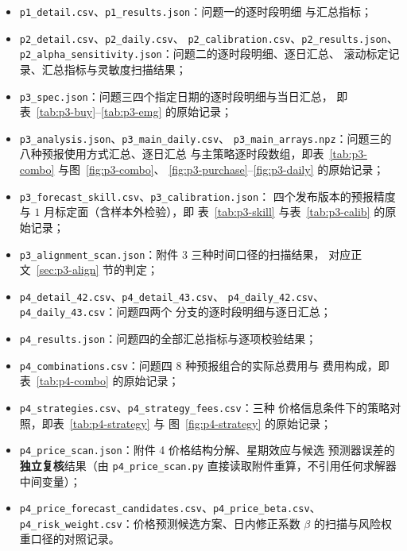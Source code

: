 \documentclass[withoutpreface,bwprint]{cumcmthesis}
\begin{document}
\begin{appendices}
\begin{itemize}
  \item \texttt{p1\_detail.csv}、\texttt{p1\_results.json}：问题一的逐时段明细
        与汇总指标；
  \item \texttt{p2\_detail.csv}、\texttt{p2\_daily.csv}、
        \texttt{p2\_calibration.csv}、\texttt{p2\_results.json}、
        \texttt{p2\_alpha\_sensitivity.json}：问题二的逐时段明细、逐日汇总、
        滚动标定记录、汇总指标与灵敏度扫描结果；
  \item \texttt{p3\_spec.json}：问题三四个指定日期的逐时段明细与当日汇总，
        即表~\ref{tab:p3-buy}--\ref{tab:p3-emg} 的原始记录；
  \item \texttt{p3\_analysis.json}、\texttt{p3\_main\_daily.csv}、
        \texttt{p3\_main\_arrays.npz}：问题三的八种预报使用方式汇总、逐日汇总
        与主策略逐时段数组，即表~\ref{tab:p3-combo} 与图~\ref{fig:p3-combo}、
        \ref{fig:p3-purchase}--\ref{fig:p3-daily} 的原始记录；
  \item \texttt{p3\_forecast\_skill.csv}、\texttt{p3\_calibration.json}：
        四个发布版本的预报精度与 $1$ 月标定面（含样本外检验），即
        表~\ref{tab:p3-skill} 与表~\ref{tab:p3-calib} 的原始记录；
  \item \texttt{p3\_alignment\_scan.json}：附件 3 三种时间口径的扫描结果，
        对应正文~\ref{sec:p3-align} 节的判定；
  \item \texttt{p4\_detail\_42.csv}、\texttt{p4\_detail\_43.csv}、
        \texttt{p4\_daily\_42.csv}、\texttt{p4\_daily\_43.csv}：问题四两个
        分支的逐时段明细与逐日汇总；
  \item \texttt{p4\_results.json}：问题四的全部汇总指标与逐项校验结果；
  \item \texttt{p4\_combinations.csv}：问题四 $8$ 种预报组合的实际总费用与
        费用构成，即表~\ref{tab:p4-combo} 的原始记录；
  \item \texttt{p4\_strategies.csv}、\texttt{p4\_strategy\_fees.csv}：三种
        价格信息条件下的策略对照，即表~\ref{tab:p4-strategy} 与
        图~\ref{fig:p4-strategy} 的原始记录；
  \item \texttt{p4\_price\_scan.json}：附件 4 价格结构分解、星期效应与候选
        预测器误差的\textbf{独立复核}结果（由 \texttt{p4\_price\_scan.py}
        直接读取附件重算，不引用任何求解器中间变量）；
  \item \texttt{p4\_price\_forecast\_candidates.csv}、\texttt{p4\_price\_beta.csv}、
        \texttt{p4\_risk\_weight.csv}：价格预测候选方案、日内修正系数
        $\beta$ 的扫描与风险权重口径的对照记录。
\end{itemize}




\end{appendices}
\end{document}
